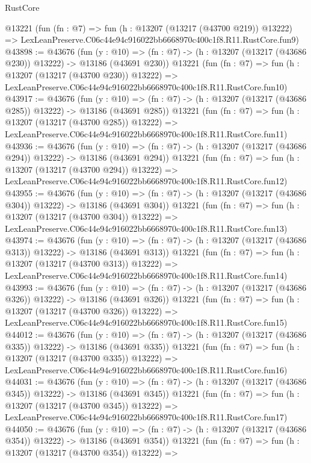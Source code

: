 \begin{lexlean}{RustCore}
\begin{coremodule}
    @13221
    (fun (fn : @7) =>
    fun (h : @13207 (@13217 (@43700 @219)) @13222) =>
    LexLeanPreserve.C06c44e94c916022bb6668970c400c1f8.R11.RustCore.fun9)
@43898 := @43676
    (fun (y : @10) =>
    (fn : @7) -> (h : @13207 (@13217 (@43686 @230)) @13222) -> @13186 (@43691 @230))
    @13221
    (fun (fn : @7) =>
    fun (h : @13207 (@13217 (@43700 @230)) @13222) =>
    LexLeanPreserve.C06c44e94c916022bb6668970c400c1f8.R11.RustCore.fun10)
@43917 := @43676
    (fun (y : @10) =>
    (fn : @7) -> (h : @13207 (@13217 (@43686 @285)) @13222) -> @13186 (@43691 @285))
    @13221
    (fun (fn : @7) =>
    fun (h : @13207 (@13217 (@43700 @285)) @13222) =>
    LexLeanPreserve.C06c44e94c916022bb6668970c400c1f8.R11.RustCore.fun11)
@43936 := @43676
    (fun (y : @10) =>
    (fn : @7) -> (h : @13207 (@13217 (@43686 @294)) @13222) -> @13186 (@43691 @294))
    @13221
    (fun (fn : @7) =>
    fun (h : @13207 (@13217 (@43700 @294)) @13222) =>
    LexLeanPreserve.C06c44e94c916022bb6668970c400c1f8.R11.RustCore.fun12)
@43955 := @43676
    (fun (y : @10) =>
    (fn : @7) -> (h : @13207 (@13217 (@43686 @304)) @13222) -> @13186 (@43691 @304))
    @13221
    (fun (fn : @7) =>
    fun (h : @13207 (@13217 (@43700 @304)) @13222) =>
    LexLeanPreserve.C06c44e94c916022bb6668970c400c1f8.R11.RustCore.fun13)
@43974 := @43676
    (fun (y : @10) =>
    (fn : @7) -> (h : @13207 (@13217 (@43686 @313)) @13222) -> @13186 (@43691 @313))
    @13221
    (fun (fn : @7) =>
    fun (h : @13207 (@13217 (@43700 @313)) @13222) =>
    LexLeanPreserve.C06c44e94c916022bb6668970c400c1f8.R11.RustCore.fun14)
@43993 := @43676
    (fun (y : @10) =>
    (fn : @7) -> (h : @13207 (@13217 (@43686 @326)) @13222) -> @13186 (@43691 @326))
    @13221
    (fun (fn : @7) =>
    fun (h : @13207 (@13217 (@43700 @326)) @13222) =>
    LexLeanPreserve.C06c44e94c916022bb6668970c400c1f8.R11.RustCore.fun15)
@44012 := @43676
    (fun (y : @10) =>
    (fn : @7) -> (h : @13207 (@13217 (@43686 @335)) @13222) -> @13186 (@43691 @335))
    @13221
    (fun (fn : @7) =>
    fun (h : @13207 (@13217 (@43700 @335)) @13222) =>
    LexLeanPreserve.C06c44e94c916022bb6668970c400c1f8.R11.RustCore.fun16)
@44031 := @43676
    (fun (y : @10) =>
    (fn : @7) -> (h : @13207 (@13217 (@43686 @345)) @13222) -> @13186 (@43691 @345))
    @13221
    (fun (fn : @7) =>
    fun (h : @13207 (@13217 (@43700 @345)) @13222) =>
    LexLeanPreserve.C06c44e94c916022bb6668970c400c1f8.R11.RustCore.fun17)
@44050 := @43676
    (fun (y : @10) =>
    (fn : @7) -> (h : @13207 (@13217 (@43686 @354)) @13222) -> @13186 (@43691 @354))
    @13221
    (fun (fn : @7) =>
    fun (h : @13207 (@13217 (@43700 @354)) @13222) =>

\end{coremodule}
\end{lexlean}

